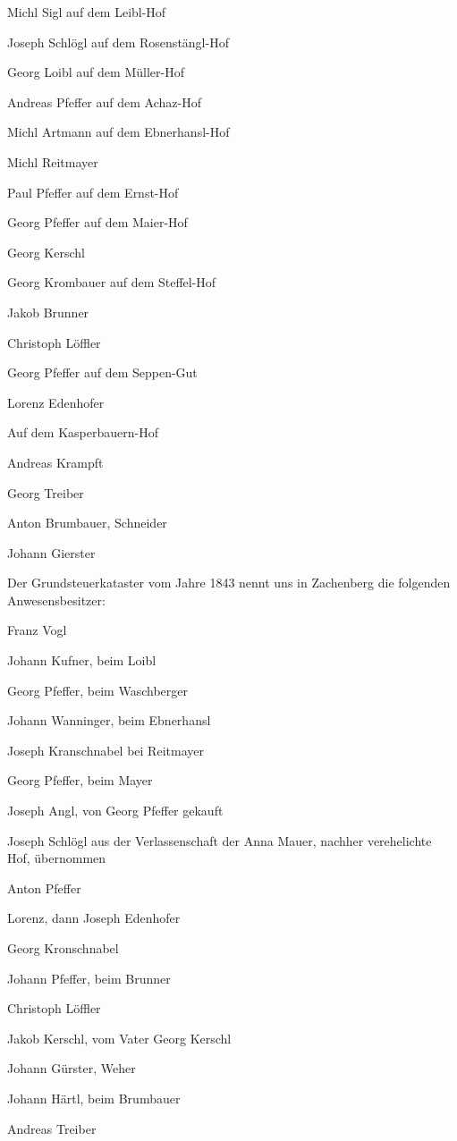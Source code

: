 \documentclass[12pt,a4pager]{book}
\begin{document}
Michl Sigl auf dem Leibl-Hof

Joseph Schlögl auf dem Rosenstängl-Hof

Georg Loibl auf dem Müller-Hof

Andreas Pfeffer auf dem Achaz-Hof

Michl Artmann auf dem Ebnerhansl-Hof

Michl Reitmayer

Paul Pfeffer auf dem Ernst-Hof

Georg Pfeffer auf dem Maier-Hof

Georg Kerschl

Georg Krombauer auf dem Steffel-Hof

Jakob Brunner

Christoph Löffler

Georg Pfeffer auf dem Seppen-Gut

Lorenz Edenhofer

Auf dem Kasperbauern-Hof

Andreas Krampft

Georg Treiber

Anton Brumbauer, Schneider

Johann Gierster

Der Grundsteuerkataster vom Jahre 1843 nennt uns in Zachenberg die folgenden
Anwesensbesitzer:

Franz Vogl

Johann Kufner, beim Loibl

Georg Pfeffer, beim Waschberger

Johann Wanninger, beim Ebnerhansl

Joseph Kranschnabel bei Reitmayer

Georg Pfeffer, beim Mayer

Joseph Angl, von Georg Pfeffer gekauft

Joseph Schlögl aus der Verlassenschaft der Anna Mauer, nachher verehelichte Hof,
übernommen

Anton Pfeffer

Lorenz, dann Joseph Edenhofer

Georg Kronschnabel

Johann Pfeffer, beim Brunner

Christoph Löffler

Jakob Kerschl, vom Vater Georg Kerschl

Johann Gürster, Weher

Johann Härtl, beim Brumbauer

Andreas Treiber
\end{document}
